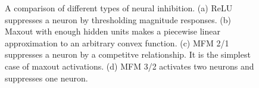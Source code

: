 \documentclass[journal,transmag]{IEEEtran}
\begin{document}
\begin{figure}
\centering
{}\hspace{0.2cm}
\caption{A comparison of different types of neural inhibition. (a) ReLU suppresses a neuron by thresholding magnitude responses. (b) Maxout with enough hidden units makes a piecewise linear approximation to an arbitrary convex function. (c) MFM 2/1 suppresses a neuron by a competitve relationship. It is the simplest case of maxout activations. (d) MFM 3/2 activates two neurons and suppresses one neuron.}
\label{fig:activation}
\end{figure}
\end{document}
